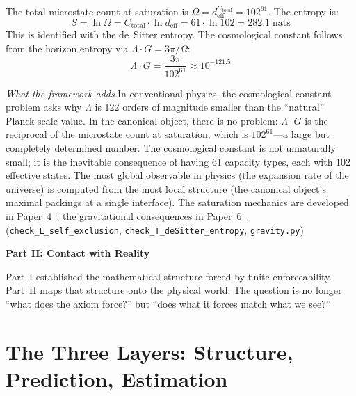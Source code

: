 \documentclass[11pt]{article}
\newcommand{\nats}{\;\mathrm{nats}}
\begin{document}
The total microstate count at saturation is $\Omega = d_{\mathrm{eff}}^{C_{\mathrm{total}}} = 102^{61}$.  The entropy is:
\begin{equation}
S = \ln\Omega = C_{\mathrm{total}} \cdot \ln d_{\mathrm{eff}} = 61 \cdot \ln 102 = 282.1 \nats
\end{equation}
This is identified with the de~Sitter entropy.  The cosmological constant follows from the horizon entropy via $\Lambda \cdot G = 3\pi/\Omega$:
\begin{equation}
\Lambda \cdot G = \frac{3\pi}{102^{61}} \approx 10^{-121.5}
\end{equation}

\textit{What the framework adds.}\quad In conventional physics, the cosmological constant problem asks why $\Lambda$ is 122 orders of magnitude smaller than the ``natural'' Planck-scale value.  In the canonical object, there is no problem: $\Lambda \cdot G$ is the reciprocal of the microstate count at saturation, which is $102^{61}$---a large but completely determined number.  The cosmological constant is not unnaturally small; it is the inevitable consequence of having 61 capacity types, each with 102 effective states.  The most global observable in physics (the expansion rate of the universe) is computed from the most local structure (the canonical object's maximal packings at a single interface).  The saturation mechanics are developed in Paper~4~\cite{P4}; the gravitational consequences in Paper~6~\cite{P6}.  (\texttt{check\_L\_self\_exclusion}, \texttt{check\_T\_deSitter\_entropy}, \texttt{gravity.py})


\newpage

{\centering\Large\bfseries Part II: Contact with Reality\par}
\vspace{8pt}

\medskip
Part~I established the mathematical structure forced by finite enforceability.  Part~II maps that structure onto the physical world.  The question is no longer ``what does the axiom force?'' but ``does what it forces match what we see?''


\section{The Three Layers: Structure, Prediction, Estimation}
\end{document}

